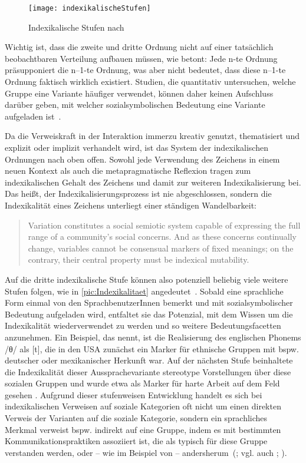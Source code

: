 \begin{figure}
\texttt{[image: indexikalischeStufen]}
\caption{Indexikalische Stufen nach \citet[]{Silverstein2003}}
\label{pic:Indexikalitaet}
\end{figure}

Wichtig ist, dass die zweite und dritte Ordnung nicht auf einer tatsächlich beobachtbaren Verteilung aufbauen müssen, wie \citet[266]{Spitzmuller2013} betont: \glqq Jede n-te Ordnung präsupponiert die n--1-te Ordnung, was aber nicht bedeutet, dass diese n--1-te Ordnung faktisch wirklich existiert\grqq. 
Studien, die quantitativ untersuchen, welche Gruppe eine Variante h{\"a}ufiger verwendet, k{\"o}nnen daher keinen Aufschluss dar{\"u}ber geben, mit welcher sozialsymbolischen Bedeutung eine Variante aufgeladen ist~\citep[s.][455]{Eckert2008}. 

Da die Verweiskraft in der Interaktion immerzu kreativ genutzt, thematisiert und explizit oder implizit verhandelt wird, ist das System der indexikalischen Ordnungen nach oben offen. 
Sowohl jede Verwendung des Zeichens in einem neuen Kontext als auch die metapragmatische Reflexion tragen zum indexikalischen Gehalt des Zeichens und damit zur weiteren Indexikalisierung bei. 
Das heißt, der Indexikalisierungsprozess ist nie abgeschlossen, sondern die Indexikalität eines Zeichens unterliegt einer ständigen Wandelbarkeit: 

\begin{quote}Variation constitutes a social semiotic system capable of expressing the full range of a community's social concerns. And as these concerns continually change, variables cannot be consensual markers of fixed meanings; on the contrary, their central property must be indexical mutability.~\citep[94]{Eckert2012}
\end{quote}
Auf die dritte indexikalische Stufe können also potenziell beliebig viele weitere Stufen folgen, wie in \autoref{pic:Indexikalitaet} angedeutet~\citep[s.][438]{Woolard2008}.
Sobald eine sprachliche Form einmal von den SprachbenutzerInnen bemerkt und mit sozialsymbolischer Bedeutung aufgeladen wird, entfaltet sie das Potenzial, mit dem Wissen um die Indexikalität wiederverwendet zu werden und so weitere Bedeutungsfacetten anzunehmen. 
Ein Beispiel, das \citet[13--14]{Eckert.2011} nennt, ist die Realisierung des englischen Phonems \mbox{/θ/} als [t], die in den USA zunächst ein Marker für ethnische Gruppen mit bspw. deutscher oder mexikanischer Herkunft war. 
Auf der nächsten Stufe beinhaltete die Indexikalität dieser Aussprachevariante stereotype Vorstellungen über diese sozialen Gruppen und wurde etwa als Marker für harte Arbeit auf dem Feld gesehen \citep[s.][13]{Eckert.2011}. 
Aufgrund dieser stufenweisen Entwicklung handelt es sich bei indexikalischen Verweisen auf soziale Kategorien oft nicht um einen direkten Verweis der Varianten auf die soziale Kategorie, sondern ein sprachliches Merkmal verweist bspw. indirekt auf eine Gruppe, indem es mit bestimmten Kommunikationspraktiken assoziiert ist, die als typisch für diese Gruppe verstanden werden, oder -- wie im Beispiel von \citet{Eckert.2011} -- andersherum~(\citealp[s.][455]{Eckert2008}; vgl. auch \citealp{Silverstein.1985}; \citealp{Ochs1996}). 

